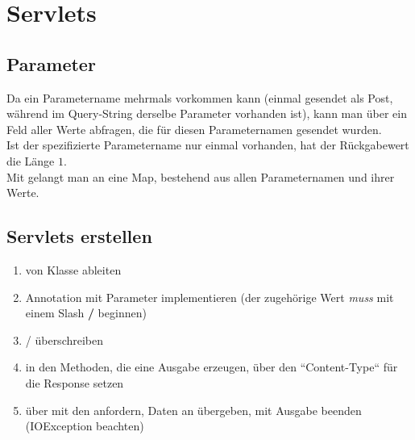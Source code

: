 \section{Servlets}

\subsection{Parameter}
Da ein Parametername mehrmals vorkommen kann (einmal gesendet als Post, während im Query-String derselbe Parameter vorhanden ist), kann man über  ein Feld aller Werte abfragen, die für diesen Parameternamen gesendet wurden.\\
Ist der spezifizierte Parametername nur einmal vorhanden, hat der Rückgabewert die Länge $1$.\\
Mit  gelangt man an eine Map, bestehend aus allen Parameternamen und ihrer Werte.

\subsection{Servlets erstellen}
\begin{enumerate}
    \item von Klasse  ableiten
    \item Annotation  mit Parameter  implementieren (der zugehörige Wert \textit{muss} mit einem Slash \textbf{/} beginnen)
    \item {} /  überschreiben
    \item in den Methoden, die eine Ausgabe erzeugen, über   den ``Content-Type`` für die Response setzen
    \item über  mit  den  anfordern, Daten an  übergeben, mit  Ausgabe beenden (IOException beachten)
\end{enumerate}